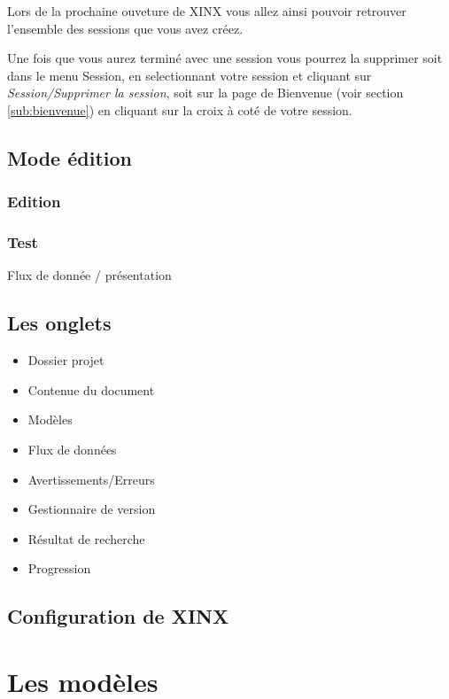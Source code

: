 \documentclass[a4paper,10pt,twoside]{book}
\begin{document}
Lors de la prochaine ouveture de XINX vous allez ainsi pouvoir retrouver l'ensemble des sessions que vous avez créez.

Une fois que vous aurez terminé avec une session vous pourrez la supprimer soit dans le menu Session, en selectionnant votre session et cliquant sur \emph{Session/Supprimer la session}, soit sur la page de Bienvenue (voir section \ref{sub:bienvenue}) en cliquant sur la croix à coté de votre session.

\section{Mode édition}

\subsection{Edition}

\subsection{Test}

Flux de donnée / présentation

\section{Les onglets}
\label{sec:dock}

\begin{itemize}
  \item Dossier projet
  \item Contenue du document
  \item Modèles
  \item Flux de données
  \item Avertissements/Erreurs
  \item Gestionnaire de version
  \item Résultat de recherche
  \item Progression
\end{itemize}

\section{Configuration de XINX}

\chapter{Les modèles}
\end{document}
